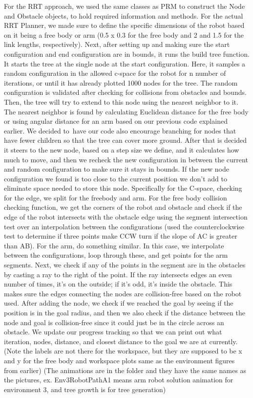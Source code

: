 \documentclass{article}
\begin{document}
For the RRT approach, we used the same classes as PRM to construct the Node and Obstacle objects, to hold required information and methods. 
For the actual RRT Planner, we made sure to define the specific dimensions of the robot based on it being a free body or arm (0.5 x 0.3 for the free body and 2 and 1.5 for the link lengths, respectively). Next, after setting up and making sure the start configuration and end configuration are in bounds, it runs the build tree function. It starts the tree at the single node at the start configuration. Here, it samples a random configuration in the allowed c-space for the robot for n number of iterations, or until it has already plotted 1000 nodes for the tree. The random configuration is validated after checking for collisions from obstacles and bounds. Then, the tree will try to extend to this node using the nearest neighbor to it. The nearest neighbor is found by calculating Euclidean distance for the free body or using angular distance for an arm based on our previous code explained earlier. We decided to have our code also encourage branching for nodes that have fewer children so that the tree can cover more ground. After that is decided it steers to the new node, based on a step size we define, and it calculates how much to move, and then we recheck the new configuration in between the current and random configuration to make sure it stays in bounds. If the new node configuration we found is too close to the current position we don't add to eliminate space needed to store this node. Specifically for the C-space, checking for the edge, we split for the freebody and arm. For the free body collision checking function, we get the corners of the robot and obstacle and check if the edge of the robot intersects with the obstacle edge using the segment intersection test over an interpolation between the configurations (used the counterclockwise test to determine if three points make CCW turn if the slope of AC is greater than AB). For the arm, do something similar. In this case, we interpolate between the configurations, loop through these, and get points for the arm segments. Next, we check if any of the points in the segment are in the obstacles by casting a ray to the right of the point. If the ray intersects edges an even number of times, it's on the outside; if it's odd, it's inside the obstacle. This makes sure the edges connecting the nodes are collision-free based on the robot used. After adding the node, we check if we reached the goal by seeing if the position is in the goal radius, and then we also check if the distance between the node and goal is collision-free since it could just be in the circle across an obstacle. We update our progress tracking so that we can print out what iteration, nodes, distance, and closest distance to the goal we are at currently. (Note the labels are not there for the workspace, but they are supposed to be x and y for the free body and workspace plots same as the environment figures from earlier) (The animations are in the folder and they have the same names as the pictures, ex. Env3RobotPathA1 means arm robot solution animation for environment 3, and tree growth is for tree generation)
\end{document}

